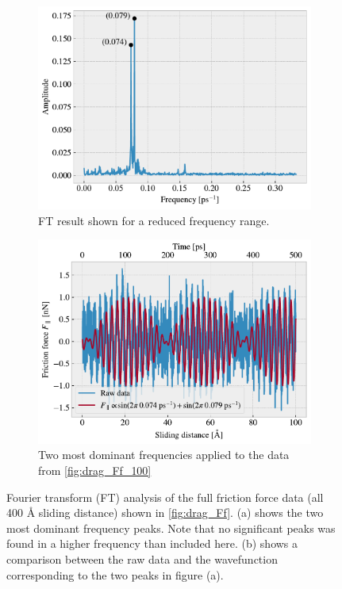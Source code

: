 \begin{figure}[H]
  \centering
  \begin{subfigure}[t]{0.49\textwidth}
    \centering
    \includegraphics[width=\textwidth]{figures/baseline/ft_zoom.pdf}
    \caption{FT result shown for a reduced frequency range.}
    \label{fig:ft_a}
  \end{subfigure}
  \hfill
  \begin{subfigure}[t]{0.49\textwidth}
      \centering
      \includegraphics[width=\textwidth]{figures/baseline/ft_sine.pdf}
      \caption{Two most dominant frequencies applied to the data from \cref{fig:drag_Ff_100}}
      \label{fig:ft_b}
  \end{subfigure}
  \caption{Fourier transform (FT) analysis of the full friction force data (all 400 Å sliding distance) shown in \cref{fig:drag_Ff}. (a) shows the two most dominant frequency peaks. Note that no significant peaks was found in a higher frequency than included here. (b) shows a comparison between the raw data and the wavefunction corresponding to the two peaks in figure (a).}
  \label{fig:ft}
\end{figure}


